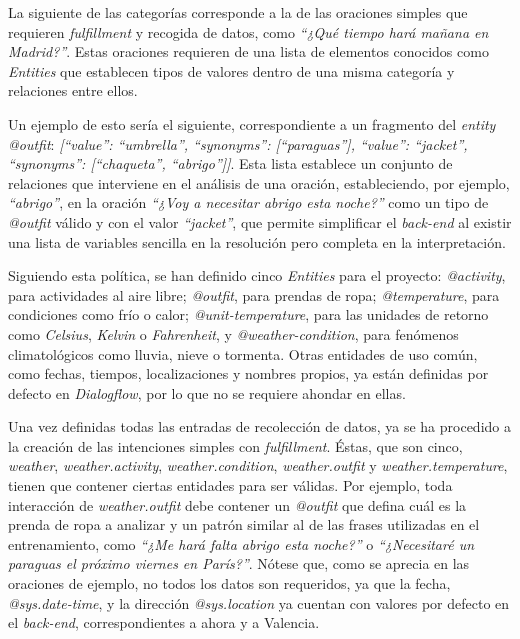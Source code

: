 \documentclass[11pt,spanish,listoffigures]{tfgetsinf}
\begin{document}
La siguiente de las categorías corresponde a la de las oraciones simples que requieren \textit{fulfillment} y recogida de datos, como \textit{“¿Qué tiempo hará mañana en Madrid?”}. Estas oraciones requieren de una lista de elementos conocidos como \textit{Entities} que establecen tipos de valores dentro de una misma categoría y relaciones entre ellos. 

Un ejemplo de esto sería el siguiente, correspondiente a un fragmento del \textit{entity} \textit{@outfit}: \textit{[{“value”: “umbrella”, “synonyms”: [“paraguas”]}, {“value”: “jacket”, “synonyms”: [“chaqueta”, “abrigo”]}]}. Esta lista establece un conjunto de relaciones que interviene en el análisis de una oración, estableciendo, por ejemplo, \textit{“abrigo”}, en la oración \textit{“¿Voy a necesitar abrigo esta noche?”} como un tipo de \textit{@outfit} válido y con el valor \textit{“jacket”}, que permite simplificar el \textit{back-end} al existir una lista de variables sencilla en la resolución pero completa en la interpretación. 

Siguiendo esta política, se han definido cinco \textit{Entities} para el proyecto: \textit{@activity}, para actividades al aire libre; \textit{@outfit}, para prendas de ropa; \textit{@temperature}, para condiciones como frío o calor; \textit{@unit-temperature}, para las unidades de retorno como \textit{Celsius}, \textit{Kelvin} o \textit{Fahrenheit}, y \textit{@weather-condition}, para fenómenos climatológicos como lluvia, nieve o  tormenta. Otras entidades de uso común, como fechas, tiempos, localizaciones y nombres propios, ya están definidas por defecto en \textit{Dialogflow}, por lo que no se requiere ahondar en ellas.

Una vez definidas todas las entradas de recolección de datos, ya se ha procedido a la creación de las intenciones simples con \textit{fulfillment}. Éstas, que son cinco, \textit{weather}, \textit{weather.activity}, \textit{weather.condition}, \textit{weather.outfit} y \textit{weather.temperature}, tienen que contener ciertas entidades para ser válidas. Por ejemplo, toda interacción de \textit{weather.outfit} debe contener un \textit{@outfit} que defina cuál es la prenda de ropa a analizar y un patrón similar al de las frases utilizadas en el entrenamiento, como \textit{“¿Me hará falta abrigo esta noche?”} o \textit{“¿Necesitaré un paraguas el próximo viernes en París?”}. Nótese que, como se aprecia en las oraciones de ejemplo, no todos los datos son requeridos, ya que la fecha, \textit{@sys.date-time}, y la dirección \textit{@sys.location} ya cuentan con valores por defecto en el \textit{back-end}, correspondientes a ahora y a Valencia. 
\end{document}

